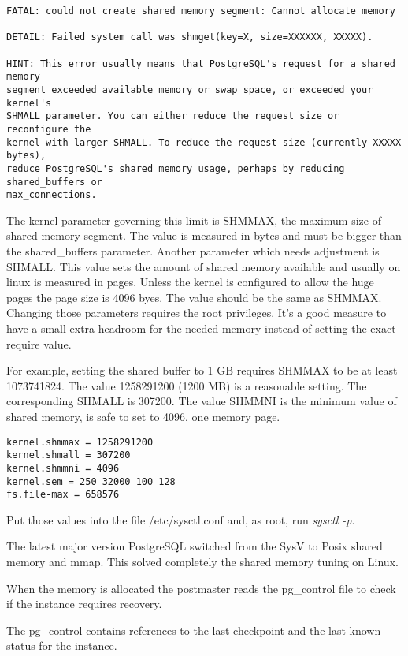\begin{verbatim}
FATAL: could not create shared memory segment: Cannot allocate memory

DETAIL: Failed system call was shmget(key=X, size=XXXXXX, XXXXX).

HINT: This error usually means that PostgreSQL's request for a shared memory
segment exceeded available memory or swap space, or exceeded your kernel's
SHMALL parameter. You can either reduce the request size or reconfigure the
kernel with larger SHMALL. To reduce the request size (currently XXXXX bytes),
reduce PostgreSQL's shared memory usage, perhaps by reducing shared_buffers or
max_connections.
\end{verbatim}

The kernel parameter governing this limit is SHMMAX, the maximum size of
shared memory segment. The value is measured in bytes and must be bigger than the shared\_buffers
parameter. Another parameter which needs adjustment is SHMALL. This value sets the amount of shared
memory available and usually on linux is measured in pages. Unless the kernel is configured to
allow the huge pages the page size is 4096 byes. The value should be the same as SHMMAX. Changing
those parameters requires the root privileges. It's a good measure to have a small extra headroom
for the needed memory instead of setting the exact require value. \newline

For example, setting the shared buffer to 1 GB requires SHMMAX to be at least 1073741824.
The value 1258291200 (1200 MB) is a reasonable setting. The corresponding SHMALL is 307200. The
value SHMMNI is the minimum value of shared memory, is safe to set to 4096, one memory page.
\begin{verbatim}
kernel.shmmax = 1258291200
kernel.shmall = 307200
kernel.shmmni = 4096
kernel.sem = 250 32000 100 128
fs.file-max = 658576
\end{verbatim}

Put those values into the file /etc/sysctl.conf and, as root, run 
\textit{sysctl -p}.

The latest major version PostgreSQL switched from the SysV to Posix shared
memory and mmap. This solved completely the shared memory tuning on Linux.

When the memory is allocated the postmaster reads the pg\_control
file to check if the instance requires recovery.

The pg\_control contains references to the last checkpoint and the last known
status for the instance. 

